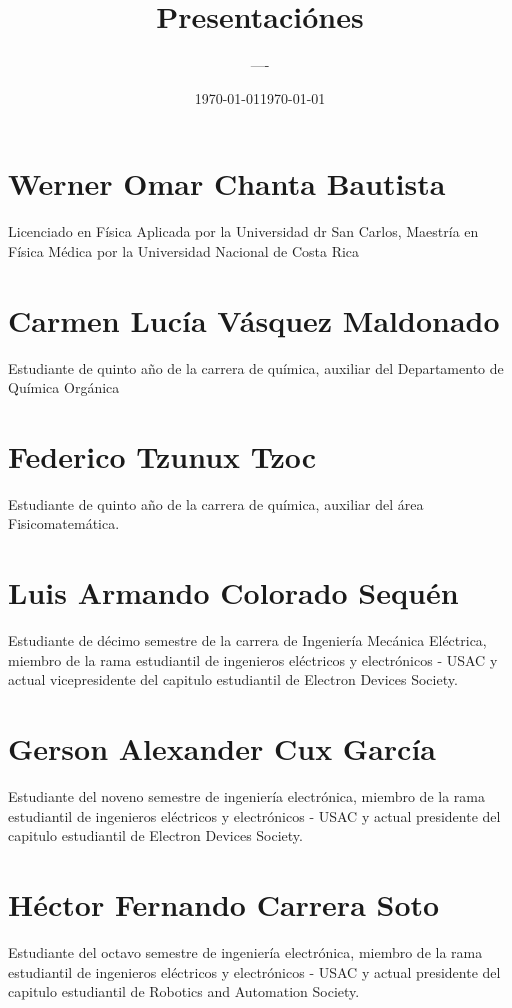 \documentclass[12pt,letterpaper, onecolumn]{article}
\title{Presentaciónes}
\author{----}
\date{\today}
\date{\today}
\begin{document}
\maketitle

\section{Werner Omar Chanta Bautista}

Licenciado en Física Aplicada por la Universidad dr San Carlos, Maestría en Física Médica por la Universidad Nacional de Costa Rica



\section{Carmen Lucía Vásquez Maldonado}

Estudiante de quinto año de la carrera de química, auxiliar del Departamento de Química Orgánica

\section{Federico Tzunux Tzoc}

Estudiante de quinto año de la carrera de química, auxiliar del área Fisicomatemática.

\section{Luis Armando Colorado Sequén}
Estudiante de décimo semestre de la carrera de Ingeniería Mecánica Eléctrica, miembro de la rama estudiantil de ingenieros eléctricos y electrónicos - USAC y actual vicepresidente del capitulo estudiantil de Electron Devices Society.



\section{Gerson Alexander Cux García}

Estudiante del noveno semestre de ingeniería electrónica, miembro de la rama estudiantil de ingenieros eléctricos y electrónicos - USAC y actual presidente del capitulo estudiantil de Electron Devices Society.


\section{Héctor Fernando Carrera Soto}


Estudiante del octavo semestre de ingeniería electrónica, miembro de la rama estudiantil de ingenieros eléctricos y electrónicos - USAC y actual presidente del capitulo estudiantil de Robotics and Automation Society.
\end{document}
